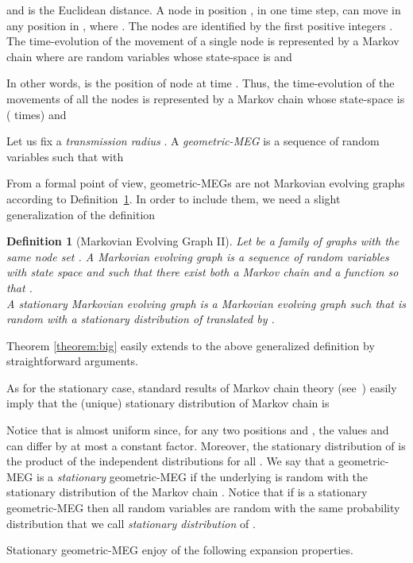 \documentclass[10pt,a4paper]{article}
\newtheorem{definition}{Definition}[section]
\begin{document}
and  is the Euclidean distance. A node in position , in one time step, can move in any position in , where . The nodes are identified by the first  positive integers . The time-evolution of the movement of a single node  is represented by a Markov chain  where  are random variables whose state-space is  and

In other words,  is the position of node  at time . Thus, the time-evolution of the movements of all the nodes is represented by a Markov chain  whose state-space is  ( times) and

Let us fix a \emph{transmission radius} . A \emph{geometric-MEG} is a sequence of random
variables  such that  with

From a formal point of view, geometric-MEGs are not Markovian evolving graphs according to Definition~\ref{def:genmg}. In order to include them, we  need a slight generalization of the definition


\begin{definition}[Markovian Evolving  Graph II]\label{def:genmg}
Let  be a family of graphs with the same node set . A \emph{Markovian evolving  graph}  is a sequence of random variables with state space  and such that there exist both  a Markov chain  and a function  so that . \\
A \emph{stationary} Markovian evolving  graph is a Markovian evolving graph  such that  is random with a stationary distribution of  translated by .
\end{definition}

\noindent Theorem \ref{theorem:big} easily extends to the above generalized definition by straightforward arguments.

\noindent As for the stationary case, standard results of Markov chain theory (see~\cite{AF99}) easily imply that the (unique) stationary distribution  of Markov chain  is

Notice that  is almost uniform since, for any two  positions  and , the values  and  can differ by at most a constant factor. Moreover, the stationary distribution of  is the product of the independent distributions  for all . We say that a geometric-MEG  is a \emph{stationary} geometric-MEG if the underlying  is random with the stationary distribution of the Markov chain . Notice that if  is a stationary geometric-MEG then all random variables  are random with the same probability distribution that we call \emph{stationary distribution} of .

\noindent Stationary geometric-MEG enjoy of the following expansion properties.
\end{document}
